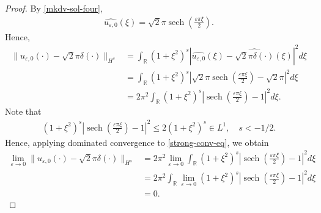 \documentclass[12pt,reqno]{amsart}
\numberwithin{equation}{section}  %
\newcommand{\rr}{\mathbb{R}}
\newcommand{\wh}{\widehat}
\newcommand{\ee}{\varepsilon}
\DeclareMathOperator{\sech}{sech}
\begin{document}
          \begin{proof}
            By \eqref{mkdv-sol-four},
            \begin{equation*}
            \begin{split}
              \wh{u_{\ee, 0}}(\xi) = \sqrt{2} \pi \sech\left( \frac{\ee \pi
              \xi}{2} \right).
            \end{split}
            \end{equation*}
            Hence,
            \begin{equation}
              \label{strong-conv-eq}
            \begin{split}
              \| u_{\ee, 0}(\cdot) -
              \sqrt{2} \pi \delta(\cdot) \|_{H^{s}}
              & = \int_{\rr} (1 + \xi^{2})^{s} | \wh{u_{\ee, 0}}(\xi) -
              \wh{\sqrt{2} \pi \delta(\cdot)}(\xi) |^{2} d \xi
              \\
              & = \int_{\rr} (1 + \xi^{2})^{s} | \sqrt{2} \pi \sech\left(
              \frac{\ee \pi \xi}{2}
              \right) - \sqrt{2} \pi |^{2} d \xi
              \\
              & = 2 \pi^{2} \int_{\rr} (1 + \xi^{2})^{s} |\sech\left( \frac{\ee \pi
              \xi}{2}
              \right) -1  |^{2} d \xi.
            \end{split}
            \end{equation}
            Note that
            \begin{equation*}
            \begin{split}
              (1 + \xi^{2})^{s} |\sech\left( \frac{\ee \pi \xi}{2} \right ) -1
              |^{2}
              \le 2(1 + \xi^{2})^{s} \in L^{1}, \quad s<-1/2.
            \end{split}
            \end{equation*}
            Hence, applying dominated convergence to \eqref{strong-conv-eq}, we
            obtain
            \begin{equation*}
            \begin{split}
              \lim_{\ee \to 0}
              \| u_{\ee, 0}(\cdot) -
              \sqrt{2} \pi \delta(\cdot) \|_{H^{s}}
              & = 2 \pi^{2} \lim_{\ee \to 0}
              \int_{\rr} (1 + \xi^{2})^{s} |\sech\left( \frac{\ee \pi
              \xi}{2}
              \right) -1  |^{2} d \xi
              \\
              & = 2 \pi^{2}  
              \int_{\rr} \lim_{\ee \to 0}
              (1 + \xi^{2})^{s} |\sech\left( \frac{\ee \pi \xi}{2}
              \right) -1  |^{2} d \xi
              \\
              & = 0. 
            \end{split}
            \end{equation*}
          \end{proof}
\end{document}
